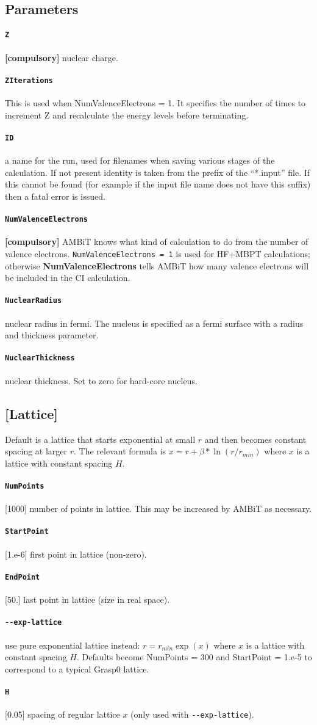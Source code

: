 \documentclass[a4paper,11pt]{article}
\newcommand{\option}[1]{\paragraph{\texttt{#1}}}
\begin{document}
\subsection{Parameters}

\option{Z} \textbf{[compulsory]} nuclear charge.

\option{ZIterations} This is used when NumValenceElectrons = 1. It specifies the number of times to increment Z and recalculate the energy levels before terminating.

\option{ID} a name for the run, used for filenames when saving various stages of the calculation. If not present identity is taken from the prefix of the ``*.input'' file. If this cannot be found (for example if the input file name does not have this suffix) then a fatal error is issued.

\option{NumValenceElectrons} \textbf{[compulsory]} AMBiT knows what kind of calculation to do from the number of valence electrons. \texttt{NumValenceElectrons = 1} is used for HF+MBPT calculations; otherwise \textbf{NumValenceElectrons} tells AMBiT how many valence electrons will be included in the CI calculation.

\option{NuclearRadius} nuclear radius in fermi. The nucleus is specified as a fermi surface with a radius and thickness parameter.

\option{NuclearThickness} nuclear thickness. Set to zero for hard-core nucleus.

\subsection*{[Lattice]}
Default is a lattice that starts exponential at small $r$ and then becomes constant spacing at larger $r$. The relevant formula is $x = r + \beta*\ln(r/r_{min})$ where $x$ is a lattice with constant spacing $H$.
\option{NumPoints} [1000] number of points in lattice. This may be increased by AMBiT as necessary.
\option{StartPoint} [1.e-6] first point in lattice (non-zero).
\option{EndPoint} [50.] last point in lattice (size in real space).

\option{-{}-exp-lattice} use pure exponential lattice instead: $r = r_{min}\exp(x)$ where $x$ is a lattice with constant spacing $H$. Defaults become NumPoints = 300 and StartPoint = 1.e-5 to correspond to a typical Grasp0 lattice.
\option{H} [0.05] spacing of regular lattice $x$ (only used with \texttt{-{}-exp-lattice}).

\end{document}
